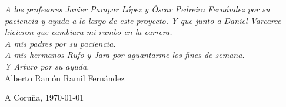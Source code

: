 
{\it
 A los profesores Javier Parapar López y Óscar Pedreira Fernández por su paciencia y ayuda a lo largo de este proyecto. Y que junto a Daniel Varcarce hicieron que cambiara mi rumbo en la carrera.\\
A mis padres por su paciencia.\\
A mis hermanos Rufo y Jara por aguantarme los fines de semana.\\
Y Arturo por su ayuda.
}
\\ 

\normalfont
\vspace{1cm}
\hfill{Alberto Ramón Ramil Fernández}

\hfill{A Coruña, \today}